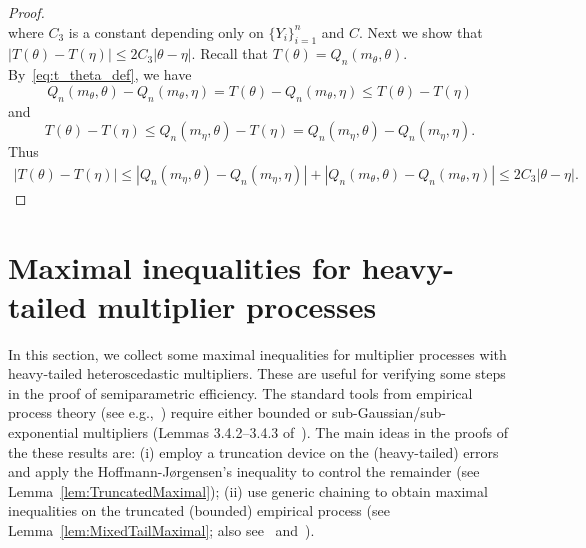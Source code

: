 \begin{proof}
\begin{equation}
\end{equation}
where $C_3$ is a constant depending only on $\{Y_i\}_{i=1}^{n}$ and $C$. Next we show that $|T(\theta)-T(\eta)|\le 2 C_3 |\theta-\eta|$. Recall that $T(\theta)= Q_n(m_{\theta}, \theta)$. By~\eqref{eq:t_theta_def}, we have
\[
 Q_n(m_{\theta}, \theta)- Q_n(m_{\theta}, \eta)= T(\theta)- Q_n(m_{\theta}, \eta)  \le T(\theta)-T(\eta)
 \]
  and \[
T(\theta)-T(\eta)  \le Q_n(m_{\eta}, \theta)-T(\eta)= Q_n(m_{\eta}, \theta)-Q_n(m_{\eta},\eta).
 \]
Thus
\begin{align*}
 |T(\theta)-T(\eta)| \le |Q_n(m_{\eta}, \theta)-Q_n(m_{\eta}, \eta) |+ |Q_n(m_{\theta}, \theta)- Q_n(m_{\theta}, \eta)|\le 2C_3 |\theta-\eta|.
 \end{align*}

\end{proof}
\section{Maximal inequalities for heavy-tailed multiplier processes} %
\label{sec:maximal_inequalities_for_heavy_tailed}

In this section, we collect some maximal inequalities for multiplier processes with heavy-tailed heteroscedastic multipliers. These are useful for verifying some steps in the proof of semiparametric efficiency. The standard tools from empirical process theory (see e.g.,~\cite{VandeGeer00,VdVW96}) require either bounded or sub-Gaussian/sub-exponential multipliers (Lemmas 3.4.2--3.4.3 of~\cite{VdVW96}). The main ideas in the proofs of the these results are: (i) employ a truncation device on the (heavy-tailed) errors and apply the Hoffmann-J{\o}rgensen's inequality to control the remainder (see Lemma~\ref{lem:TruncatedMaximal}); (ii) use generic chaining to obtain maximal inequalities on the truncated (bounded) empirical process (see Lemma~\ref{lem:MixedTailMaximal}; also see~\cite[Theorem 3.5]{Dirksen} and~\cite[Theorem~2.2.23]{MR3184689}).

